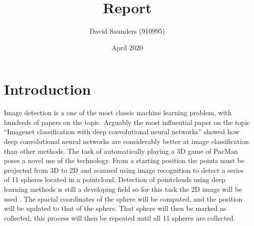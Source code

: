 \documentclass{article}
\title{Report}
\author{David Saunders (910995)}
\date{April 2020}
\begin{document}
\maketitle



\section{Introduction}

Image detection is a one of the most classic machine learning problem, with hundreds of papers on the topic.
Arguably the most influential paper on the topic ``Imagenet classification with deep convolutional neural networks'' showed how deep convolutional neural networks are considerably better at image classification than other methods.
The task of automatically playing a 3D game of PacMan poses a novel use of the technology.
From a starting position the points must be projected from 3D to 2D and scanned using image recognition to detect a series of 11 spheres located in a pointcloud.
Detection of pointclouds using deep learning methods is still a developing field so for this task the 2D image will be used \cite{guo2019deep}. 
The spacial coordinates of the sphere will be computed, and the position will be updated to that of the sphere.
That sphere will then be marked as collected, this process will then be repeated until all 11 spheres are collected.



\end{document}
